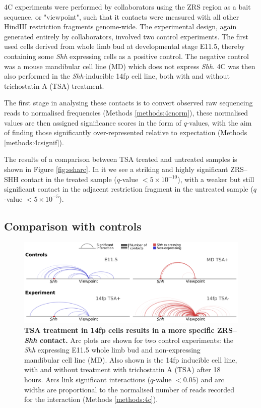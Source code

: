 \documentclass[a4paper,11pt,oneside]{book}
\begin{document}
4C experiments were performed by collaborators using the ZRS region as a bait sequence, or "viewpoint", such that it contacts were measured with all other HindIII restriction fragments genome-wide. The experimental design, again generated entirely by collaborators, involved two control experiments. The first used cells derived from whole limb bud at developmental stage E11.5, thereby containing some \emph{Shh} expressing cells as a positive control. The negative control was a mouse mandibular cell line (MD) which does not express \emph{Shh}. 4C was then also performed in the \emph{Shh}-inducible 14fp cell line, both with and without trichostatin A (TSA) treatment.

The first stage in analysing these contacts is to convert observed raw sequencing reads to normalised frequencies (Methods \ref{methods:4cnorm}), these normalised values are then assigned significance scores in the form of $q$-values, with the aim of finding those significantly over-represented relative to expectation (Methods \ref{methods:4csignif}).

The results of a comparison between TSA treated and untreated samples is shown in Figure \ref{fig:ssharc}. In it we see a striking and highly significant ZRS--SHH contact in the treated sample ($q$-value $ < 5 \times 10^{-10}$), with a weaker but still significant contact in the adjacent restriction fragment in the untreated sample ($q$-value $ < 5 \times 10^{-5}$). 

\subsection{Comparison with controls}

\begin{figure}
\begin{center} 
\includegraphics[width=5.5in]{figs/4c_4way.pdf}
\captionsetup{width=\textwidth} 
\caption[ TSA treatment in 14fp cells results in a more specific ZRS--\emph{Shh} contact. ]{ {\bf TSA treatment in 14fp cells results in a more specific ZRS--\emph{Shh} contact. }
Arc plots are shown for two control experiments: the \emph{Shh} expressing E11.5 whole limb bud and non-expressing mandibular cell line (MD). Also shown is the 14fp inducible cell line, with and without treatment with trichostatin A (TSA) after 18 hours. Arcs link significant interactions ($q$-value $< 0.05$) and arc widths are proportional to the normalised number of reads recorded for the interaction (Methods \ref{methods:4c}).
}\label{fig:4c4way}
\end{center} 
\end{figure} 
\end{document}
